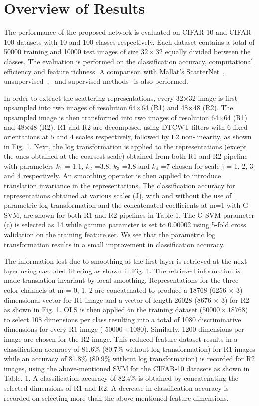 \documentclass{article}
\begin{document}
\section{Overview of Results}
\label{headings}
The performance of the proposed network is evaluated on CIFAR-10 and CIFAR-100 datasets with 10 and 100 classes respectively. Each dataset contains a total of 50000 training and 10000 test images of size $32\times32$ equally divided between the classes. The evaluation is performed on the classification accuracy, computational efficiency and feature richness. A comparison with Mallat's ScatterNet~\cite{Oyallon2015}, unsupervised~\cite{sohn},~\cite{jia} and supervised methods~\cite{NIN} is also performed.

In order to extract the scattering representations, every 32$\times$32 image is first upsampled into two images of resolution 64$\times$64 (R1) and 48$\times$48 (R2). The upsampled image is then transformed into two images of resolution 64$\times$64 (R1) and 48$\times$48 (R2). R1 and R2 are decomposed using DTCWT filters with 6 fixed orientations at 5 and 4 scales respectively, followed by L2 non-linearity, as shown in Fig. 1. Next, the log transformation is applied to the representations (except the ones obtained at the coarsest scale) obtained from both R1 and R2 pipeline with parameters $k_{1}$ = 1.1, $k_{2}$ =3.8, $k_{3}$ =3.8 and $k_{4}$ =7 chosen for scale j = 1, 2, 3 and 4 respectively. An smoothing operator is then applied to introduce translation invariance in the representations. The classification accuracy for representations obtained at various scales (J), with and without the use of parametric log transformation and the concatenated coefficients at m=1 with G-SVM, are shown for both R1 and R2 pipelines in Table 1. The G-SVM parameter (c) is selected as 14 while gamma parameter is set to 0.00002 using 5-fold cross validation on the training feature set. We see that the parametric log transformation results in a small improvement in classification accuracy. 

The information lost due to smoothing at the first layer is retrieved at the next layer using cascaded filtering as shown in Fig. 1. The retrieved information is made translation invariant by local smoothing. Representations for the three color channels at m = 0, 1, 2 are concatenated to produce a 18768 (6256 $\times$ 3) dimensional vector for R1 image and a vector of length 26028 (8676 $\times$ 3) for R2 as shown in Fig. 1. OLS is then applied on the training dataset ($50000 \times 18768$) to select 108 dimensions per class resulting into a total of 1080 discriminative dimensions for every R1 image ( $50000 \times 1080$).  Similarly, 1200 dimensions per image are chosen for the R2 image. This reduced feature dataset results in a classification accuracy of 81.6\% (80.7\% without log transformation) for R1 images while an accuracy of 81.8\% (80.9\% without log transformation) is recorded for R2 images, using the above-mentioned SVM for the CIFAR-10 datasets as shown in Table. 1. A classification accuracy of 82.4\% is obtained by concatenating the selected dimensions of R1 and R2. A decrease in classification accuracy is recorded on selecting more than the above-mentioned feature dimensions. \vspace{-5mm}
\end{document}

